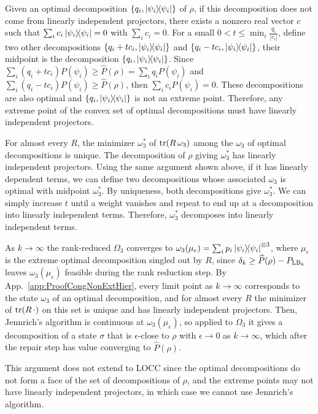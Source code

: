 \documentclass[aps,pra,twocolumn,showpacs,superscriptaddress,groupedaddress]{revtex4-2}
\begin{document}
\begin{widetext}
Given an optimal decomposition $\{q_i, \dyad{\psi_i}\}$ of $\rho$, if this decomposition does not come from linearly independent projectors, there exists a nonzero real vector $c$ such that $\sum_i c_i \dyad{\psi_i} = 0$ with $\sum_i c_i=0$.
For a small $0<t\leq \min_i \tfrac{q_i}{|c_i|}$, define two other decompositions $\{q_i + t c_i, \dyad{\psi_i}\}$ and $\{q_i - t c_i, \dyad{\psi_i}\}$, their midpoint is the decomposition $\{q_i, \dyad{\psi_i}\}$.
Since $\sum_i (q_i+t c_i) P(\psi_i) \geq \widehat{P}(\rho)=\sum_i q_i P(\psi_i)$ and $\sum_i (q_i- t c_i) P(\psi_i) \geq \widehat{P}(\rho)$, then $\sum_i c_i P(\psi_i) = 0$. These decompositions are also optimal and $\{q_i, \dyad{\psi_i}\}$ is not an extreme point. Therefore, any extreme point of the convex set of optimal decompositions must have linearly independent projectors.

For almost every $R$, the minimizer $\omega_3^*$ of $\tr(R\,\omega_3)$ among the $\omega_3$ of optimal decompositions is unique. The decomposition of $\rho$ giving $\omega_3^*$ has linearly independent projectors. Using the same argument shown above, if it has linearly dependent terms, we can define two decompositions whose associated $\omega_3$ is optimal with midpoint $\omega_3^*$. By uniqueness, both decompositions give $\omega_3^*$. We can simply increase $t$ until a weight vanishes and repeat to end up at a decomposition into linearly independent terms. Therefore, $\omega_3^*$ decomposes into linearly independent terms.

As $k\to\infty$ the rank-reduced $\Omega_3$ converges to $\omega_3(\mu_e)=\sum_ip_i\dyad{\psi_i}^{\otimes3}$, where
$\mu_e$ is the extreme optimal decomposition singled out by $R$, since $\delta_k \geq \widehat{P}(\rho)-P_{{\rm LB}_k}$ leaves $\omega_3(\mu_e)$ feasible during the rank reduction step.
By App.~\ref{app:ProofCongNonExtHier}, every limit point as $k\to \infty$ corresponds to the state $\omega_3$ of an optimal decomposition, and for almost every $R$ the minimizer of $\tr(R\,\cdot)$ on this set is unique and has linearly independent projectors. 
Then, Jennrich's algorithm is continuous at $\omega_3(\mu_e)$, so applied to $\Omega_3$ it gives a decomposition of a state $\sigma$ that is $\epsilon$-close to $\rho$ with $\epsilon\to0$ as $k\to\infty$, which after the repair step has value converging to $\widehat{P}(\rho)$.

This argument does not extend to LOCC since the optimal decompositions do not form a face of the set of decompositions of $\rho$, and the extreme points may not have linearly independent projectors, in which case we cannot use Jennrich's algorithm.


\end{widetext}
\end{document}

